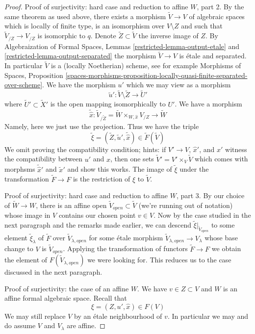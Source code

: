 \begin{proof}
\medskip\noindent
Proof of surjectivity: hard case and reduction to affine $W$, part 2.
By the same theorem as used above, there exists a morphism
$\tilde V \to V$ of algebraic spaces which is locally of finite type,
is an isomorphism over $V \setminus Z$ and such that
$\tilde V_{/Z} \to V_{/Z}$ is isomorphic to $q$.
Denote $\tilde Z \subset \tilde V$ the inverse image of $Z$.
By Algebraization of Formal Spaces, Lemmas
\ref{restricted-lemma-output-etale} and \ref{restricted-lemma-output-separated}
the morphism $\tilde V \to V$ is \'etale and separated.
In particular $\tilde V$ is a (locally Noetherian) scheme, see for example
Morphisms of Spaces, Proposition
\ref{spaces-morphisms-proposition-locally-quasi-finite-separated-over-scheme}.
We have the morphism $u'$ which we may view as a morphism
$$
\tilde u' : \tilde V \setminus \tilde Z \longrightarrow \tilde U'
$$
where $\tilde U' \subset \tilde X'$ is the open mapping isomorphically
to $U'$. We have a morphism
$$
\tilde {\hat x} :
\tilde V_{/\tilde Z} = \tilde W \times_{W, \hat x} V_{/Z}
\longrightarrow
\tilde W
$$
Namely, here we just use the projection. Thus we have the triple
$$
\tilde \xi = (\tilde Z, \tilde u', \tilde {\hat x}) \in \tilde F(\tilde V)
$$
We omit proving the compatibility condition; hints: if $V' \to V$, $\hat x'$,
and $x'$ witness the compatibility between $u'$ and $\hat x$, then one
sets $\tilde V' = V' \times_V \tilde V$ which comes with morphsms
$\tilde{\hat x}'$ and $\tilde x'$ and show this works.
The image of $\tilde \xi$ under the transformation $\tilde F \to F$
is the restriction of $\xi$ to $\tilde V$.

\medskip\noindent
Proof of surjectivity: hard case and reduction to affine $W$, part 3.
By our choice of $\tilde W \to W$, there is an affine open
$\tilde V_{open} \subset \tilde V$ (we're running out of notation)
whose image in $V$ contains our chosen point $v \in V$.
Now by the case studied in the next paragraph and the remarks made
earlier, we can descend $\tilde \xi|_{\tilde V_{open}}$
to some element $\tilde \xi_\lambda$ of $\tilde F$ over
$\tilde V_{\lambda, open}$
for some \'etale morphism $\tilde V_{\lambda, open} \to V_\lambda$
whose base change to $V$ is $\tilde V_{open}$.
Applying the transformation of functors $\tilde F \to F$
we obtain the element of $F(\tilde V_{\lambda, open})$
we were looking for. This reduces us to the case discussed
in the next paragraph.

\medskip\noindent
Proof of surjectivity: the case of an affine $W$. We have $v \in Z \subset V$
and $W$ is an affine formal algebraic space. Recall that
$$
\xi = (Z, u', \hat x) \in F(V)
$$
We may still replace $V$ by an \'etale neighbourhood of $v$.
In particular we may and do assume $V$ and $V_\lambda$ are affine.


\end{proof}
